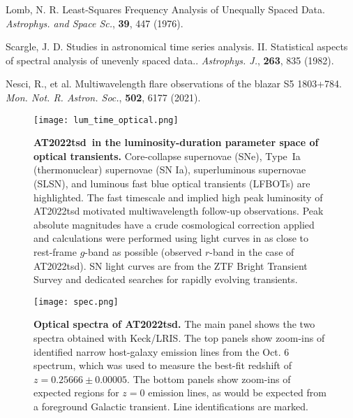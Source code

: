 \documentclass{nature_plusfigure}
\newcommand{\mn}{{Mon. Not. R. Astron. Soc.}}
\newcommand{\mnras}{\mn}
\newcommand{\apj}{{Astrophys. J.}}
\newcommand{\apss}{{Astrophys. and Space Sc.}}
\newcommand{\at}{AT2022tsd}
\begin{document}
\begin{methods}
\begin{thebibliography}{10}
 Lomb, N. R. Least-Squares Frequency Analysis of Unequally Spaced Data. \emph{\apss}, \textbf{39}, 447 (1976). 

 Scargle, J. D. Studies in astronomical time series analysis. II. Statistical aspects of spectral analysis of unevenly spaced data.. \emph{\apj}, \textbf{263}, 835 (1982). 

 Nesci, R., et al. Multiwavelength flare observations of the blazar S5 1803+784. \emph{\mnras}, \textbf{502}, 6177 (2021). 


\end{thebibliography}

\end{methods}

\clearpage

\begin{extended_data}

\renewcommand{\thefigure}{\arabic{figure}~Extended~Data}
\renewcommand{\thefigure}{Extended Data Figure \arabic{figure}}
\renewcommand{\figurename}{}
\setcounter{figure}{0}

\renewcommand{\thetable}{\arabic{table}~Extended~Data}
\renewcommand{\thetable}{Extended Data Table \arabic{table}}
\renewcommand{\tablename}{}
\setcounter{table}{0}

\begin{figure}[ht]
\centering
\texttt{[image: lum\_time\_optical.png]}
\caption{\textbf{\at\ in the luminosity-duration parameter space of optical transients.} Core-collapse supernovae (SNe), Type~Ia (thermonuclear) supernovae (SN Ia), superluminous supernovae (SLSN), and luminous fast blue optical transients (LFBOTs\cite{Prentice2018,Perley2019,Perley2021,Ho2020_Koala,Yao2022,Coppejans2020}) are highlighted. The fast timescale and implied high peak luminosity of AT2022tsd motivated multiwavelength follow-up observations. Peak absolute magnitudes have a crude cosmological correction applied and calculations were performed using light curves in as close to rest-frame $g$-band as possible (observed $r$-band in the case of \at). SN light curves are from the ZTF Bright Transient Survey\cite{PerleyBTS,FremlingBTS} and dedicated searches for rapidly evolving transients\cite{Ho2022_RET}.}
\label{fig:opt-phase-space}
\end{figure}

\begin{figure}[ht]
 \centering
\texttt{[image: spec.png]}
  \caption{\textbf{Optical spectra of \at.} The main panel shows the two spectra obtained with Keck/LRIS. The top panels show zoom-ins of identified narrow host-galaxy emission lines from the Oct. 6 spectrum, which was used to measure the best-fit redshift of $z=0.25666\pm0.00005$. The bottom panels show zoom-ins of expected regions for $z=0$ emission lines, as would be expected from a foreground Galactic transient. Line identifications are marked.}
 \label{fig:spec}
\end{figure}


\end{extended_data}
\end{document}
